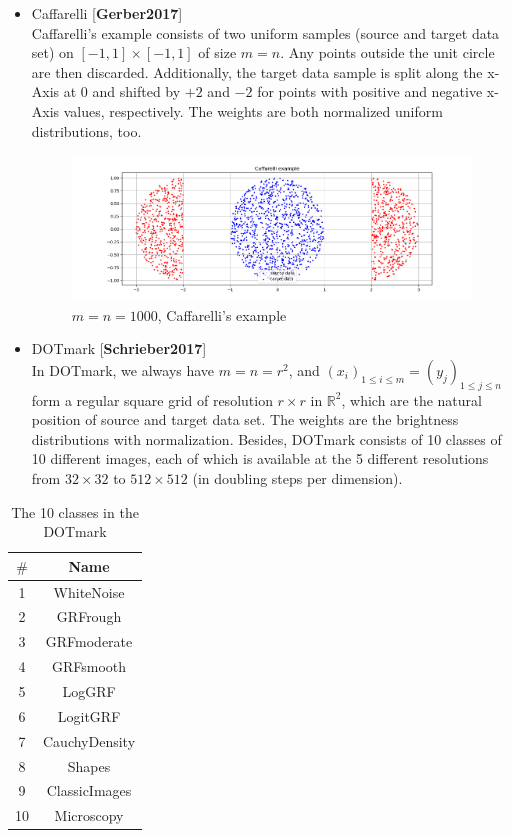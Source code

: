 \documentclass{article}
\begin{document}
\begin{large}
\begin{itemize}
  
  \item Caffarelli [\textbf{Gerber2017}]\\
  Caffarelli’s example consists of two uniform samples (source and target data set) on $[-1, 1]\times[-1, 1]$  of size $m=n$. Any points outside the unit circle are then
discarded. Additionally, the target data sample is split along the x-Axis at 0 and shifted by
$+2$ and $-2$ for points with positive and negative x-Axis values, respectively. The weights are both normalized uniform distributions, too.
\begin{figure}[H]
  \centering
  \includegraphics[width=.9\textwidth]{caffa.png}
  \captionsetup{justification=centering}
  \caption{\label{fig:caffa}$m=n=1000$, Caffarelli’s example}
\end{figure}
  \item DOTmark [\textbf{Schrieber2017}]\\
  In DOTmark, we always have $m=n=r^{2}$, and $(x_i)_{1\leq i\leq m} = (y_j)_{1\leq j\leq n}$ form a regular square grid of resolution $r\times r$ in $\mathbb{R}^{2}$, which are the natural position of source and target data set. The weights are the brightness distributions with normalization. Besides, DOTmark consists of 10 classes of 10 different
  images, each of which is available at the 5 different
  resolutions from $32\times32$ to $512\times512$ (in doubling steps per dimension).
\end{itemize}

\begin{table}[H]
  \centering
  \begin{tabular}{|c|c|}
  \hline
  $\#$&Name\\
  \hline
  \hline
  1&WhiteNoise\\
  2&GRFrough\\
  3&GRFmoderate\\
  4&GRFsmooth\\
  5&LogGRF\\
  6&LogitGRF\\
  7&CauchyDensity\\
  8&Shapes\\
  9&ClassicImages\\
  10&Microscopy\\
  \hline
  \end{tabular}
  \caption{\label{tab:table1}The 10 classes in the DOTmark}
\end{table}


\end{large}
\end{document}
